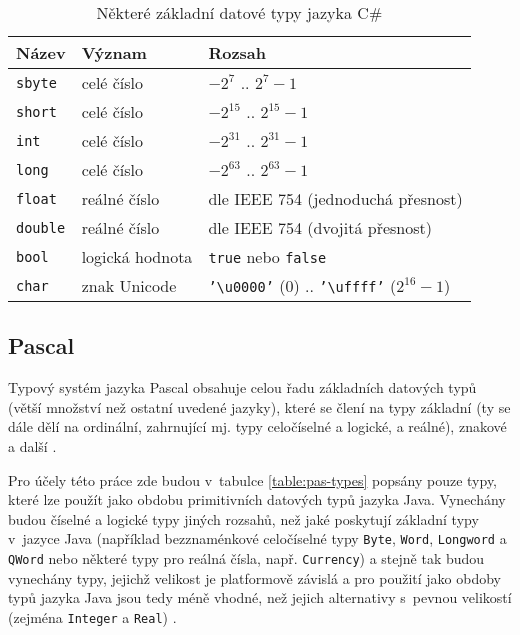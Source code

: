 \documentclass{bakalarka}
\begin{document}
\begin{table}\centering
\caption{Některé základní datové typy jazyka C\#}
\begin{tabular}{| l | l | l |}
\hline
\textbf{Název} & \textbf{Význam} & \textbf{Rozsah} \\ \hline
\texttt{sbyte} & celé číslo & $-2^7$ .. $2^7-1$ \\ \hline
\texttt{short} & celé číslo & $-2^{15}$ .. $2^{15}-1$ \\ \hline
\texttt{int} & celé číslo & $-2^{31}$ .. $2^{31}-1$ \\ \hline
\texttt{long} & celé číslo & $-2^{63}$ .. $2^{63}-1$ \\ \hline
\texttt{float} & reálné číslo & dle IEEE 754 (jednoduchá přesnost) \\ \hline
\texttt{double} & reálné číslo & dle IEEE 754 (dvojitá přesnost) \\ \hline
\texttt{bool} & logická hodnota & \texttt{true} nebo \texttt{false} \\ \hline
\texttt{char} & znak Unicode & \texttt{'\textbackslash u0000'} ($0$) .. \texttt{'\textbackslash uffff'} ($2^{16} - 1$) \\ \hline
\end{tabular}
\label{table:cs-types}
\end{table}

\subsection{Pascal}
Typový systém jazyka Pascal obsahuje celou řadu základních datových typů (větší množství než ostatní uvedené jazyky), které se člení na typy základní (ty se dále dělí na ordinální, zahrnující mj. typy celočíselné a logické, a reálné), znakové a další \cite{pas-guide-types, pas-guide-base-types, pas-guide-character-types}.

Pro účely této práce zde budou v~tabulce \ref{table:pas-types} popsány pouze typy, které lze použít jako obdobu primitivních datových typů jazyka Java. Vynechány budou číselné a logické typy jiných rozsahů, než jaké poskytují základní typy v~jazyce Java (například bezznaménkové celočíselné typy \texttt{Byte}, \texttt{Word}, \texttt{Longword} a \texttt{QWord} nebo některé typy pro reálná čísla, např. \texttt{Currency}) a stejně tak budou vynechány typy, jejichž velikost je platformově závislá a pro použití jako obdoby typů jazyka Java jsou tedy méně vhodné, než jejich alternativy s~pevnou velikostí (zejména \texttt{Integer} a \texttt{Real}) \cite{pas-guide-types, pas-guide-integer, pas-guide-boolean, pas-guide-real}.\par
\end{document}
